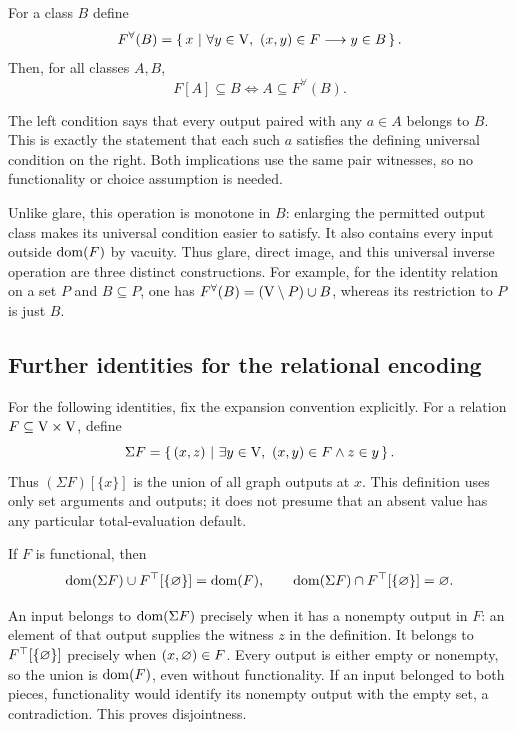 \begin{proposition}
For a class $B$ define
\[
F^{\forall}(B)=\left\{\,x\ \middle|\ \forall y\in\mathrm{V},\ (x,y)\in F\longrightarrow y\in B\,\right\}.
\]
Then, for all classes $A,B$,
\[
F[A]\subseteq B\iff A\subseteq F^{\forall}(B).
\]
\end{proposition}
\Proof
The left condition says that every output paired with any $a\in A$
belongs to $B$. This is exactly the statement that each such $a$ satisfies
the defining universal condition on the right. Both implications use the
same pair witnesses, so no functionality or choice assumption is needed.
\Done

Unlike glare, this operation is monotone in $B$: enlarging the permitted
output class makes its universal condition easier to satisfy. It also
contains every input outside $\mathrm{dom}(F)$ by vacuity. Thus glare, direct
image, and this universal inverse operation are three distinct
constructions. For example, for the identity relation on a set $P$ and
$B\subseteq P$, one has
$F^{\forall}(B)=(\mathrm{V}\setminus P)\cup B$, whereas its restriction to $P$
is just $B$.

\subsection{Further identities for the relational encoding}
For the following identities, fix the expansion convention explicitly. For a relation
$F\subseteq\mathrm{V}\times\mathrm{V}$, define
\[
\Sigma F=\left\{\,(x,z)\ \middle|\ \exists y\in\mathrm{V},\ (x,y)\in F\land z\in y\,\right\}.
\]
Thus $(\Sigma F)[\{x\}]$ is the union of all graph outputs at $x$.
This definition uses only set arguments and outputs; it does not presume
that an absent value has any particular total-evaluation default.

\begin{theorem}
If $F$ is functional, then
\[
\mathrm{dom}(\Sigma F)\cup F^\top[\{\varnothing\}]=\mathrm{dom}(F),
\qquad
\mathrm{dom}(\Sigma F)\cap F^\top[\{\varnothing\}]=\varnothing.
\]
\end{theorem}
\Proof
An input belongs to $\mathrm{dom}(\Sigma F)$ precisely when it has a nonempty
output in $F$: an element of that output supplies the witness $z$ in
the definition. It belongs to $F^\top[\{\varnothing\}]$ precisely when
$(x,\varnothing)\in F$. Every output is either empty or nonempty, so the
union is $\mathrm{dom}(F)$, even without functionality. If an input belonged to
both pieces, functionality would identify its nonempty output with the
empty set, a contradiction. This proves disjointness.
\Done

